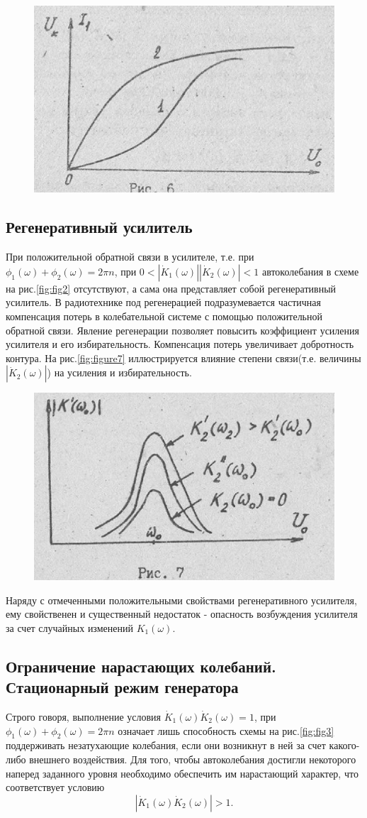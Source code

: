 \begin{figure}[h]
	\centering
	\includegraphics[width=0.4\linewidth]{circuit/6.jpg}
	\caption{}
	\label{fig:fig6}
\end{figure}

\subsection{Регенеративный усилитель}
При положительной обратной связи в усилителе, т.е. при $\phi_1(\omega)+\phi_2(\omega)=2\pi n$, при $0<|\dot{K}_1(\omega)||\dot{K}_2(\omega)|<1$ автоколебания в схеме на рис.\ref{fig:fig2} отсутствуют, а сама она представляет собой регенеративный усилитель. В радиотехнике под регенерацией подразумевается частичная компенсация потерь в колебательной системе с помощью положительной обратной связи. Явление регенерации позволяет повысить коэффициент усиления усилителя и его избирательность. Компенсация потерь увеличивает добротность контура. На рис.\ref{fig:figure7} иллюстрируется влияние степени связи(т.е. величины $|\dot{K}_2(\omega)|$) на усиления и избирательность.

\begin{figure}[h]
	\centering
	\includegraphics[width=0.4\linewidth]{circuit/7.jpg}
	\caption{}
	\label{fig:fig7}
\end{figure}

Наряду с отмеченными положительными свойствами регенеративного усилителя, ему свойственен и существенный недостаток - опасность возбуждения усилителя за счет случайных изменений $K_1(\omega)$.

\subsection{Ограничение нарастающих колебаний. Стационарный режим генератора} 
Строго говоря, выполнение условия $\dot{K}_1(\omega)\dot{K}_2(\omega)=1$, при $\phi_1(\omega)+\phi_2(\omega)=2\pi n$ означает лишь способность схемы на рис.\ref{fig:fig3} поддерживать незатухающие колебания, если они возникнут в ней за счет какого-либо внешнего воздействия. Для того, чтобы автоколебания достигли некоторого наперед заданного уровня необходимо обеспечить им нарастающий характер, что соответствует условию
\begin{equation*}
|\dot{K}_1(\omega)\dot{K}_2(\omega)|>1.
\end{equation*}

